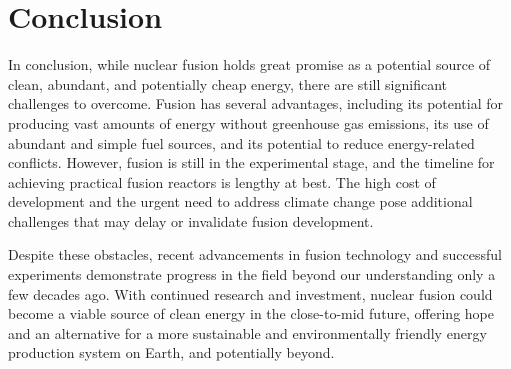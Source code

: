 \documentclass[12pt]{article}
\begin{document}
    \section{Conclusion}

    In conclusion, while nuclear fusion holds great promise as a potential source of clean, abundant, and potentially cheap energy, there are still significant challenges to overcome. Fusion has several advantages, including its potential for producing vast amounts of energy without greenhouse gas emissions, its use of abundant and simple fuel sources, and its potential to reduce energy-related conflicts. However, fusion is still in the experimental stage, and the timeline for achieving practical fusion reactors is lengthy at best. The high cost of development and the urgent need to address climate change pose additional challenges that may delay or invalidate fusion development. 
    
    Despite these obstacles, recent advancements in fusion technology and successful experiments demonstrate progress in the field beyond our understanding only a few decades ago. With continued research and investment, nuclear fusion could become a viable source of clean energy in the close-to-mid future, offering hope and an alternative for a more sustainable and environmentally friendly energy production system on Earth, and potentially beyond. 

    \pagebreak

    \pagestyle{empty}

    

    
\end{document}
